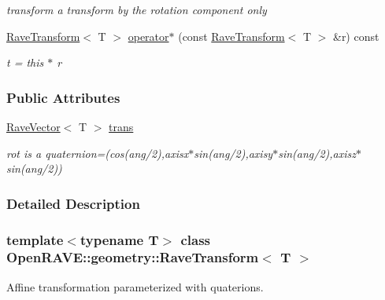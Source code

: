 \begin{DoxyCompactItemize}
\begin{DoxyCompactList}\small\item\em transform a transform by the rotation component only \item\end{DoxyCompactList}\item 
\hypertarget{classOpenRAVE_1_1geometry_1_1RaveTransform_abc0c6acd93346ae4a8009931a8c69d26}{
\hyperlink{classOpenRAVE_1_1geometry_1_1RaveTransform}{RaveTransform}$<$ T $>$ \hyperlink{classOpenRAVE_1_1geometry_1_1RaveTransform_abc0c6acd93346ae4a8009931a8c69d26}{operator$\ast$} (const \hyperlink{classOpenRAVE_1_1geometry_1_1RaveTransform}{RaveTransform}$<$ T $>$ \&r) const }
\label{classOpenRAVE_1_1geometry_1_1RaveTransform_abc0c6acd93346ae4a8009931a8c69d26}

\begin{DoxyCompactList}\small\item\em t = this $\ast$ r \item\end{DoxyCompactList}\end{DoxyCompactItemize}
\subsubsection*{Public Attributes}
\begin{DoxyCompactItemize}
\item 
\hypertarget{classOpenRAVE_1_1geometry_1_1RaveTransform_aad5195f0043f898ac6fbf0a8bceca2c6}{
\hyperlink{classOpenRAVE_1_1geometry_1_1RaveVector}{RaveVector}$<$ T $>$ \hyperlink{classOpenRAVE_1_1geometry_1_1RaveTransform_aad5195f0043f898ac6fbf0a8bceca2c6}{trans}}
\label{classOpenRAVE_1_1geometry_1_1RaveTransform_aad5195f0043f898ac6fbf0a8bceca2c6}

\begin{DoxyCompactList}\small\item\em rot is a quaternion=(cos(ang/2),axisx$\ast$sin(ang/2),axisy$\ast$sin(ang/2),axisz$\ast$sin(ang/2)) \item\end{DoxyCompactList}\end{DoxyCompactItemize}


\subsubsection{Detailed Description}
\subsubsection*{template$<$typename T$>$ class OpenRAVE::geometry::RaveTransform$<$ T $>$}

Affine transformation parameterized with quaterions. 